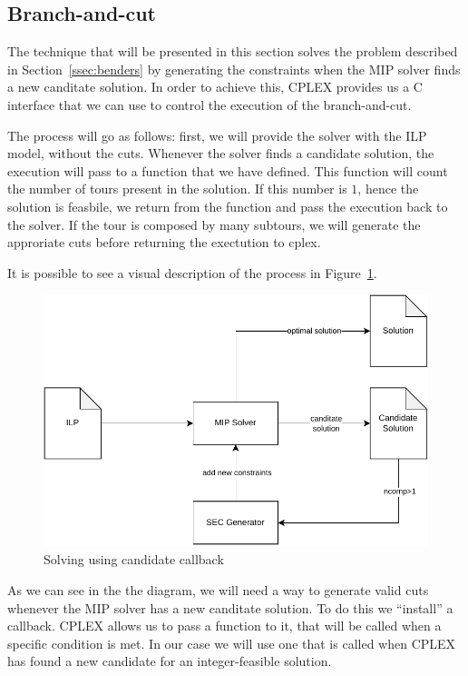 \documentclass{article}
\begin{document}
\subsection{Branch-and-cut}
The technique that will be presented in this section solves the problem
described in Section~\ref{ssec:benders} by generating the constraints when
the MIP solver finds a new canditate solution. In order to achieve this,
CPLEX provides us a C interface that we can use to control the execution
of the branch-and-cut.

The process will go as follows: first, we will provide the solver with the
ILP model, without the cuts. Whenever the solver finds a candidate solution,
the execution will pass to a function that we have defined. This function
will count the number of tours present in the solution. If this number is $1$,
hence the solution is feasbile, we return from the function and pass the
execution back to the solver. If the tour is composed by many subtours,
we will generate the approriate cuts before returning the exectution to
cplex.

It is possible to see a visual description of the process in
Figure~\ref{fig:callback}.

\begin{figure}[ht]
        \caption{Solving using candidate callback}
        \label{fig:callback}
        \centering
        \includegraphics[width=340pt]{assets/callback.drawio.pdf}
\end{figure}

As we can see in the the diagram, we will need a way to generate valid cuts
whenever the MIP solver has a new canditate solution. To do this we ``install''
a callback. CPLEX allows us to pass a function to it, that will be called when
a specific condition is met. In our case we will use one that is called when CPLEX
has found a new candidate for an integer-feasible solution.
\end{document}
